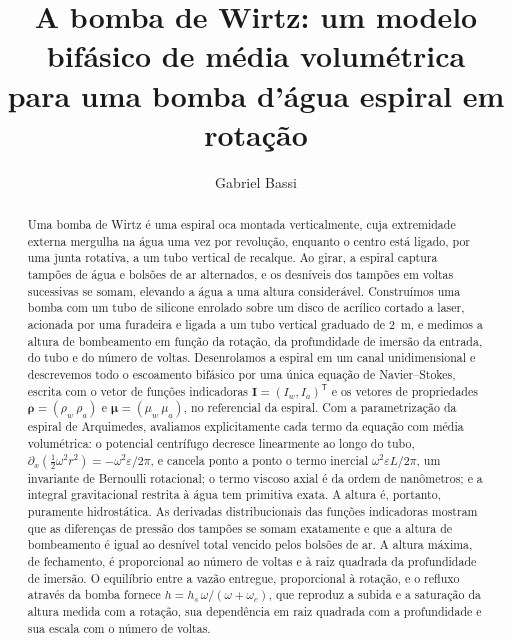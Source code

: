 \documentclass[aps,pre,twocolumn,superscriptaddress,nofootinbib,floatfix]{revtex4-2}
\begin{document}
\renewcommand{\figurename}{Fig.}
\renewcommand{\tablename}{Tabela}

\title{A bomba de Wirtz: um modelo bifásico de média volumétrica\\ para uma bomba d'água espiral em rotação}

\author{Gabriel Bassi}

\begin{abstract}
Uma bomba de Wirtz é uma espiral oca montada verticalmente, cuja extremidade externa mergulha na água uma vez por revolução, enquanto o centro está ligado, por uma junta rotativa, a um tubo vertical de recalque. Ao girar, a espiral captura tampões de água e bolsões de ar alternados, e os desníveis dos tampões em voltas sucessivas se somam, elevando a água a uma altura considerável. Construímos uma bomba com um tubo de silicone enrolado sobre um disco de acrílico cortado a laser, acionada por uma furadeira e ligada a um tubo vertical graduado de \SI{2}{m}, e medimos a altura de bombeamento em função da rotação, da profundidade de imersão da entrada, do tubo e do número de voltas. Desenrolamos a espiral em um canal unidimensional e descrevemos todo o escoamento bifásico por uma única equação de Navier--Stokes, escrita com o vetor de funções indicadoras $\mathbf I=(I_w,I_a)^{\mathsf T}$ e os vetores de propriedades $\bm\rho=(\rho_w\ \rho_a)$ e $\bm\mu=(\mu_w\ \mu_a)$, no referencial da espiral. Com a parametrização da espiral de Arquimedes, avaliamos explicitamente cada termo da equação com média volumétrica: o potencial centrífugo decresce linearmente ao longo do tubo, $\partial_x(\tfrac12\omega^2r^2)=-\omega^2\varepsilon/2\pi$, e cancela ponto a ponto o termo inercial $\omega^2\varepsilon L/2\pi$, um invariante de Bernoulli rotacional; o termo viscoso axial é da ordem de nanômetros; e a integral gravitacional restrita à água tem primitiva exata. A altura é, portanto, puramente hidrostática. As derivadas distribucionais das funções indicadoras mostram que as diferenças de pressão dos tampões se somam exatamente e que a altura de bombeamento é igual ao desnível total vencido pelos bolsões de ar. A altura máxima, de fechamento, é proporcional ao número de voltas e à raiz quadrada da profundidade de imersão. O equilíbrio entre a vazão entregue, proporcional à rotação, e o refluxo através da bomba fornece $h=h_s\,\omega/(\omega+\omega_c)$, que reproduz a subida e a saturação da altura medida com a rotação, sua dependência em raiz quadrada com a profundidade e sua escala com o número de voltas.
\end{abstract}
\end{document}
